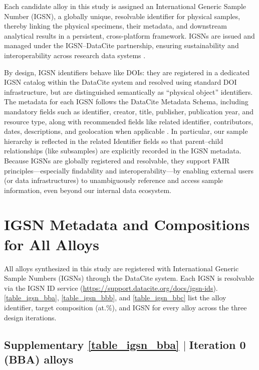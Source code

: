 \documentclass[final,5p,times,twocolumn]{elsarticle}
\begin{document}
Each candidate alloy in this study is assigned an International Generic Sample Number (IGSN), a globally unique, resolvable identifier for physical samples, thereby linking the physical specimens, their metadata, and downstream analytical results in a persistent, cross-platform framework. IGSNs are issued and managed under the IGSN--DataCite partnership, ensuring sustainability and interoperability across research data systems \cite{datacite-igsn-ids}.

By design, IGSN identifiers behave like DOIs: they are registered in a dedicated IGSN catalog within the DataCite system and resolved using standard DOI infrastructure, but are distinguished semantically as ``physical object'' identifiers. The metadata for each IGSN follows the DataCite Metadata Schema, including mandatory fields such as identifier, creator, title, publisher, publication year, and resource type, along with recommended fields like related identifier, contributors, dates, descriptions, and geolocation when applicable \cite{igsn-metadata-schema}. In particular, our sample hierarchy is reflected in the related Identifier fields so that parent--child relationships (like subsamples) are explicitly recorded in the IGSN metadata. Because IGSNs are globally registered and resolvable, they support FAIR principles---especially findability and interoperability---by enabling external users (or data infrastructures) to unambiguously reference and access sample information, even beyond our internal data ecosystem.


\section{IGSN Metadata and Compositions for All Alloys}
\label{s1_igsn_compositions}

All alloys synthesized in this study are registered with International Generic Sample Numbers (IGSNs) through the DataCite system. Each IGSN is resolvable via the IGSN ID service (\url{https://support.datacite.org/docs/igsn-ids}). \autoref{table_igsn_bba}, \autoref{table_igsn_bbb}, and \autoref{table_igsn_bbc} list the alloy identifier, target composition (at.\%), and IGSN for every alloy across the three design iterations.

\cleardoublepage
\onecolumn
\subsection{\texorpdfstring{\textbf{Supplementary \autoref{table_igsn_bba}} \texorpdfstring{$\mid\;$}{Lg}Iteration 0 (BBA) alloys}{Supplementary Table -- Iteration 0 (BBA) alloys}}
\label{s1_igsn_bba}
\vspace{-1em}
\end{document}
